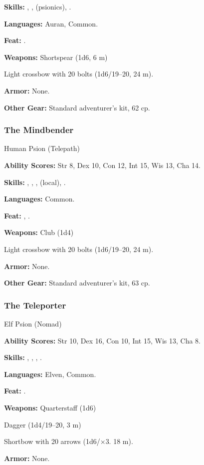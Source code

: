 \textbf{Skills:} , ,  (psionics), .

\textbf{Languages:} Auran, Common.

\textbf{Feat:} .

\textbf{Weapons:} Shortspear (1d6, 6 m)

Light crossbow with 20 bolts (1d6/19--20, 24 m).

\textbf{Armor:} None.

\textbf{Other Gear:} Standard adventurer's kit, 62 cp.

\subsubsection{The Mindbender}
Human Psion (Telepath)

\textbf{Ability Scores:} Str 8, Dex 10, Con 12, Int 15, Wis 13, Cha 14.

\textbf{Skills:} , , ,  (local), .

\textbf{Languages:} Common.

\textbf{Feat:} , .

\textbf{Weapons:} Club (1d4)

Light crossbow with 20 bolts (1d6/19--20, 24 m).

\textbf{Armor:} None.

\textbf{Other Gear:} Standard adventurer's kit, 63 cp.

\subsubsection{The Teleporter}
Elf Psion (Nomad)

\textbf{Ability Scores:} Str 10, Dex 16, Con 10, Int 15, Wis 13, Cha 8.

\textbf{Skills:} , , , .

\textbf{Languages:} Elven, Common.

\textbf{Feat:} .

\textbf{Weapons:} Quarterstaff (1d6)

Dagger (1d4/19--20, 3 m)

Shortbow with 20 arrows (1d6/$\times$3. 18 m).

\textbf{Armor:} None.

